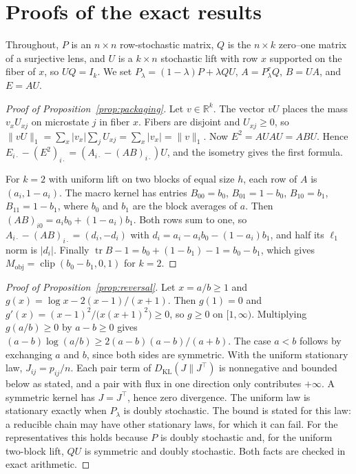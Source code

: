 \section{Proofs of the exact results}
\label{app:proofs}

Throughout, $P$ is an $n\times n$ row-stochastic matrix, $Q$ is the $n\times k$ zero--one matrix of a surjective lens, and $U$ is a $k\times n$ stochastic lift with row $x$ supported on the fiber of $x$, so $UQ=I_k$. We set $P_\lambda=(1-\lambda)P+\lambda QU$, $A=P_\lambda^{\tau}Q$, $B=UA$, and $E=AU$.

\begin{proof}[Proof of Proposition~\ref{prop:packaging}]
Let $v\in\mathbb{R}^k$. The vector $vU$ places the mass $v_xU_{xj}$ on microstate $j$ in fiber $x$. Fibers are disjoint and $U_{xj}\ge0$, so $\|vU\|_1=\sum_x|v_x|\sum_jU_{xj}=\sum_x|v_x|=\|v\|_1$. Now $E^2=AUAU=ABU$. Hence $E_{i\cdot}-(E^2)_{i\cdot}=(A_{i\cdot}-(AB)_{i\cdot})U$, and the isometry gives the first formula.

For $k=2$ with uniform lift on two blocks of equal size $h$, each row of $A$ is $(a_i,1-a_i)$. The macro kernel has entries $B_{00}=b_0$, $B_{01}=1-b_0$, $B_{10}=b_1$, $B_{11}=1-b_1$, where $b_0$ and $b_1$ are the block averages of $a$. Then $(AB)_{i0}=a_ib_0+(1-a_i)b_1$. Both rows sum to one, so $A_{i\cdot}-(AB)_{i\cdot}=(d_i,-d_i)$ with $d_i=a_i-a_ib_0-(1-a_i)b_1$, and half its $\ell_1$ norm is $|d_i|$. Finally $\operatorname{tr}B-1=b_0+(1-b_1)-1=b_0-b_1$, which gives $M_{\mathrm{obj}}=\operatorname{clip}(b_0-b_1,0,1)$ for $k=2$.
\end{proof}

\begin{proof}[Proof of Proposition~\ref{prop:reversal}]
Let $x=a/b\ge1$ and $g(x)=\log x-2(x-1)/(x+1)$. Then $g(1)=0$ and $g'(x)=(x-1)^2/\bigl(x(x+1)^2\bigr)\ge0$, so $g\ge0$ on $[1,\infty)$. Multiplying $g(a/b)\ge0$ by $a-b\ge0$ gives $(a-b)\log(a/b)\ge2(a-b)(a-b)/(a+b)$. The case $a<b$ follows by exchanging $a$ and $b$, since both sides are symmetric. With the uniform stationary law, $J_{ij}=p_{ij}/n$. Each pair term of $D_{\mathrm{KL}}(J\|J^{\top})$ is nonnegative and bounded below as stated, and a pair with flux in one direction only contributes $+\infty$. A symmetric kernel has $J=J^{\top}$, hence zero divergence. The uniform law is stationary exactly when $P_\lambda$ is doubly stochastic. The bound is stated for this law: a reducible chain may have other stationary laws, for which it can fail. For the representatives this holds because $P$ is doubly stochastic and, for the uniform two-block lift, $QU$ is symmetric and doubly stochastic. Both facts are checked in exact arithmetic.
\end{proof}

